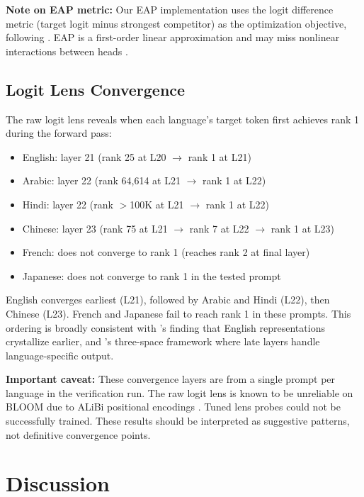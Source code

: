 \documentclass[11pt]{article}
\begin{document}
\textbf{Note on EAP metric:} Our EAP implementation uses the logit difference metric (target logit minus strongest competitor) as the optimization objective, following \citet{nanda2023attribution}.
EAP is a first-order linear approximation and may miss nonlinear interactions between heads \cite{syed2024attribution}.

\subsection{Logit Lens Convergence}
\label{sec:results:logitlens}

The raw logit lens reveals when each language's target token first achieves rank 1 during the forward pass:

\begin{itemize}
\item English: layer 21 (rank 25 at L20 $\to$ rank 1 at L21)
\item Arabic: layer 22 (rank 64,614 at L21 $\to$ rank 1 at L22)
\item Hindi: layer 22 (rank $>$100K at L21 $\to$ rank 1 at L22)
\item Chinese: layer 23 (rank 75 at L21 $\to$ rank 7 at L22 $\to$ rank 1 at L23)
\item French: does not converge to rank 1 (reaches rank 2 at final layer)
\item Japanese: does not converge to rank 1 in the tested prompt
\end{itemize}

English converges earliest (L21), followed by Arabic and Hindi (L22), then Chinese (L23). French and Japanese fail to reach rank 1 in these prompts.
This ordering is broadly consistent with \citet{wendler2024llamas}'s finding that English representations crystallize earlier, and \citet{zhao2024crosslingual}'s three-space framework where late layers handle language-specific output.

\textbf{Important caveat:} These convergence layers are from a single prompt per language in the verification run.
The raw logit lens is known to be unreliable on BLOOM due to ALiBi positional encodings \cite{belrose2023tuned}.
Tuned lens probes could not be successfully trained.
These results should be interpreted as suggestive patterns, not definitive convergence points.

\section{Discussion}
\end{document}
